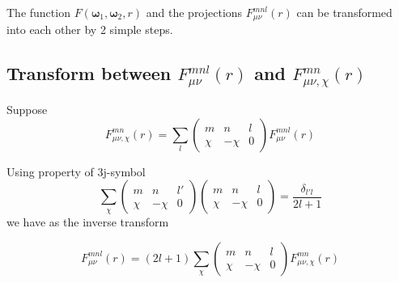 The function $F(\boldsymbol{\omega}_{1},\boldsymbol{\omega}_{2},r)$
and the projections $F_{\mu\nu}^{mnl}(r)$ can be transformed into
each other by 2 simple steps.

\subsection*{Transform between $F_{\mu\nu}^{mnl}(r)$ and $F_{\mu\nu,\chi}^{mn}(r)$ }

Suppose
\begin{equation}
F_{\mu\nu,\chi}^{mn}(r)=\sum_{l}\left(\begin{array}{ccc}
m & n & l\\
\chi & -\chi & 0
\end{array}\right)F_{\mu\nu}^{mnl}(r)\label{eq:def_f_mn_munuchi}
\end{equation}

Using property of 3j-symbol \citep{Messiah}
\begin{equation}
\sum_{\chi}\left(\begin{array}{ccc}
m & n & l'\\
\chi & -\chi & 0
\end{array}\right)\left(\begin{array}{ccc}
m & n & l\\
\chi & -\chi & 0
\end{array}\right)=\frac{\delta_{l'l}}{2l+1}
\end{equation}
we have as the inverse transform

\begin{equation}
F_{\mu\nu}^{mnl}(r)=\left(2l+1\right)\sum_{\chi}\left(\begin{array}{ccc}
m & n & l\\
\chi & -\chi & 0
\end{array}\right)F_{\mu\nu,\chi}^{mn}(r)\label{eq:def_f_mnl_munu}
\end{equation}

